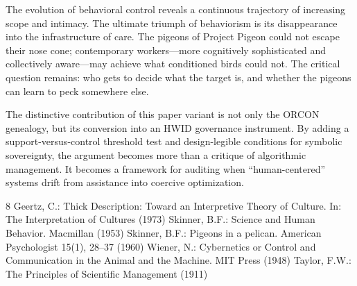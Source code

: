 \documentclass[11pt, a4paper]{article}
\begin{document}
The evolution of behavioral control reveals a continuous trajectory of increasing scope and intimacy. The ultimate triumph of behaviorism is its disappearance into the infrastructure of care. The pigeons of Project Pigeon could not escape their nose cone; contemporary workers—more cognitively sophisticated and collectively aware—may achieve what conditioned birds could not. The critical question remains: who gets to decide what the target is, and whether the pigeons can learn to peck somewhere else.

The distinctive contribution of this paper variant is not only the ORCON genealogy, but its conversion into an HWID governance instrument. By adding a support-versus-control threshold test and design-legible conditions for symbolic sovereignty, the argument becomes more than a critique of algorithmic management. It becomes a framework for auditing when ``human-centered'' systems drift from assistance into coercive optimization.

\begin{thebibliography}{8}
 Geertz, C.: Thick Description: Toward an Interpretive Theory of Culture. In: The Interpretation of Cultures (1973)
 Skinner, B.F.: Science and Human Behavior. Macmillan (1953)
 Skinner, B.F.: Pigeons in a pelican. American Psychologist 15(1), 28--37 (1960)
 Wiener, N.: Cybernetics or Control and Communication in the Animal and the Machine. MIT Press (1948)
 Taylor, F.W.: The Principles of Scientific Management (1911)
\end{thebibliography}
\end{document}
